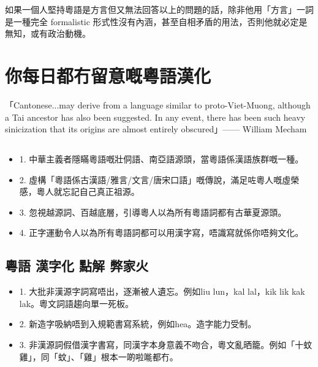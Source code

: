 如果一個人堅持粵語是方言但又無法回答以上的問題的話，除非他用「方言」一詞是一種完全 formalistic 形式性沒有內涵，甚至自相矛盾的用法，否則他就必定是無知，或有政治動機。


\section{你每日都冇留意嘅粵語漢化}

「Cantonese...may derive from a language similar to proto-Viet-Muong, although a Tai ancestor has also been suggested. In any event, there has been such heavy sinicization that its origins are almost entirely obscured」—— William Mecham


\subsection{}
\begin{itemize}
  \item[] 1. 中華主義者隱瞞粵語嘅壯侗語、南亞語源頭，當粵語係漢語族群嘅一種。

  \item[] 2. 虛構「粵語係古漢語/雅言/文言/唐宋口語」嘅傳說，滿足咗粵人嘅虛榮感，粵人就忘記自己真正祖源。

  \item[] 3. 忽視越源詞、百越底層，引導粵人以為所有粵語詞都有古華夏源頭。

  \item[] 4. 正字運動令人以為所有粵語詞都可以用漢字寫，唔識寫就係你唔夠文化。
\end{itemize}




\subsection*{粵語 漢字化 點解 弊家火}
\begin{itemize}
  \item[] 1. 大批非漢源字詞寫唔出，逐漸被人遺忘。例如liu lun，kal lal，kik lik kak lak。粵文詞語趨向單一死板。

  \item[] 2. 新造字吸納唔到入規範書寫系統，例如hea。造字能力受制。

  \item[] 3. 非漢源詞假借漢字書寫，同漢字本身意義不吻合，粵文亂晒籠。例如「十蚊雞」，同「蚊」、「雞」根本一啲啦𠹌都冇。
\end{itemize}




